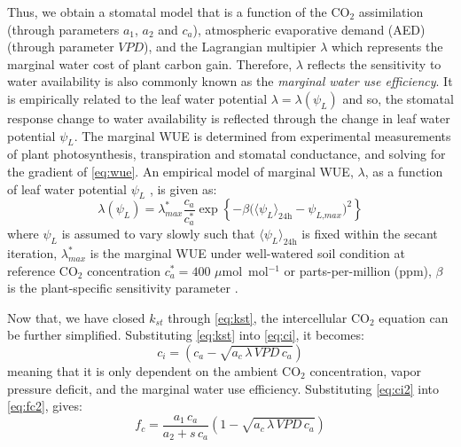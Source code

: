 Thus, we obtain a stomatal model that is a function of the CO$_2$ assimilation (through parameters $a_1$, $a_2$ and $c_a$), atmospheric evaporative demand (AED) (through parameter $\textit{VPD}$), and the Lagrangian multipier $\lambda$ which represents the marginal water cost of plant carbon gain. Therefore, $\lambda$ reflects the sensitivity to water availability is also commonly known as the \textit{marginal water use efficiency}. It is empirically related to the leaf water potential $\lambda = \lambda(\psi_L)$ \citep{Manoli2014,Katul2010} and so, the stomatal response change to water availability is reflected through the change in leaf water potential $\psi_L$. The marginal WUE is determined from experimental measurements of plant photosynthesis, transpiration and stomatal conductance, and solving for the gradient of 
\cref{eq:wue}. An empirical model of marginal WUE, $\lambda$, as a function of leaf water potential $\psi_L$ \citep{Manoli2014,Katul2010}, is given as:
\begin{equation}
\lambda \left(\psi_L\right) = \lambda_{\textit{max}}^* \frac{c_a}{c_a^*}\exp \left\{-\beta \Big( \langle \psi_L \rangle_{\textit{24h}} - \psi_{\textit{L,max}}\Big)^2\right\}
\label{eq:mwue}
\end{equation}
where $\psi_L$ is assumed to vary slowly such that $\langle \psi_L \rangle_{\textit{24h}}$ is fixed within the secant iteration, $\lambda_{max}^*$ is the marginal WUE under well-watered soil condition at reference CO$_2$ concentration $c_a^*=400$ $\mu$mol~mol$^{-1}$ or parts-per-million (ppm), $\beta$ is the plant-specific sensitivity parameter \citep{Huang2017}.

Now that, we have closed $k_{\textit{st}}$ through \cref{eq:kst}, the intercellular CO$_2$ equation can be further simplified. Substituting \cref{eq:kst} into \cref{eq:ci}, it becomes:
\begin{equation}
c_i = \left(c_a - \sqrt{a_c\,\lambda\, \textit{VPD}\, c_a} \right)
\label{eq:ci2}
\end{equation}
meaning that it is only dependent on the ambient CO$_2$ concentration, vapor pressure deficit, and the marginal water use efficiency. Substituting \cref{eq:ci2} into \cref{eq:fc2}, gives:
\begin{equation}
f_c = \frac{a_1\,c_a}{a_2 + s\,c_a}\left(1-\sqrt{a_c\, \lambda\, \textit{VPD}\, c_a}\right)
\end{equation} 

